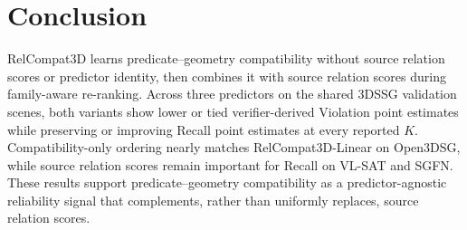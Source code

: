 \section{Conclusion}

RelCompat3D learns predicate--geometry compatibility without source relation scores or predictor identity, then combines it with source relation scores during family-aware re-ranking. Across three predictors on the shared 3DSSG validation scenes, both variants show lower or tied verifier-derived Violation point estimates while preserving or improving Recall point estimates at every reported $K$. Compatibility-only ordering nearly matches RelCompat3D-Linear on Open3DSG, while source relation scores remain important for Recall on VL-SAT and SGFN. These results support predicate--geometry compatibility as a predictor-agnostic reliability signal that complements, rather than uniformly replaces, source relation scores.